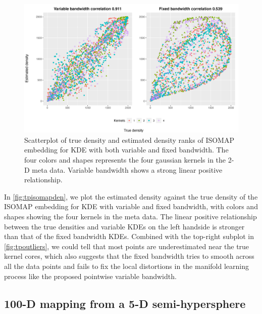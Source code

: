 \documentclass[11pt,a4paper,]{article}
\begin{document}
\begin{figure}

{\centering \includegraphics[width=0.95\linewidth]{figures/Twin Peak_density_comparison_isomap_riem0_1_rank} 

}

\caption{Scatterplot of true density and estimated density ranks of ISOMAP embedding for KDE with both variable and fixed bandwidth. The four colors and shapes represents the four gaussian kernels in the 2-D meta data. Variable bandwidth shows a strong linear positive relationship.}\label{fig:tpisomapden}
\end{figure}

In \autoref{fig:tpisomapden}, we plot the estimated density against the true density of the ISOMAP embedding for KDE with variable and fixed bandwidth, with colors and shapes showing the four kernels in the meta data. The linear positive relationship between the true densities and variable KDEs on the left handside is stronger than that of the fixed bandwidth KDEs. Combined with the top-right subplot in \autoref{fig:tpoutliers}, we could tell that most points are underestimated near the true kernel cores, which also suggests that the fixed bandwidth tries to smooth across all the data points and fails to
fix the local distortions in the manifold learning process like the proposed pointwise variable bandwidth.

\hypertarget{fivedgaussian}{%
\subsection{100-D mapping from a 5-D semi-hypersphere}\label{fivedgaussian}}
\end{document}
